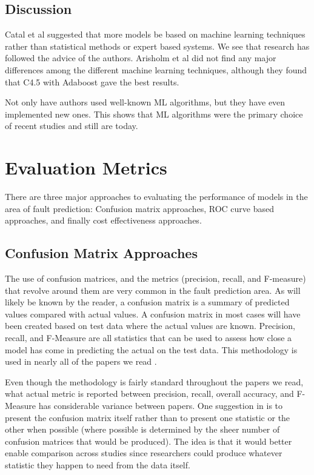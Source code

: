 \documentclass{sig-alternate-05-2015}
\begin{document}
\subsection{Discussion}
Catal et al \cite{Catal} suggested that more models be based on machine learning techniques rather than statistical methods or expert based systems. We see that research has followed the advice of the authors. Arisholm et al \cite{Arisholm} did not find any major differences among the different machine learning techniques, although they found that C4.5 with Adaboost gave the best results. 

Not only have authors used well-known ML algorithms, but they have even implemented new ones. This shows that ML algorithms were the primary choice of recent studies and still are today.

\section{Evaluation Metrics}

There are three major approaches to evaluating the performance of models in the area of fault prediction:  Confusion matrix approaches, ROC curve based approaches, and finally cost effectiveness approaches.

\subsection{Confusion Matrix Approaches}

The use of confusion matrices, and the metrics (precision, recall, and F-measure) that revolve around them are very common in the fault prediction area.  As will likely be known by the reader, a confusion matrix is a summary of predicted values compared with actual values.  A confusion matrix in most cases will have been created based on test data where the actual values are known.  Precision, recall, and F-Measure are all statistics that can be used to assess how close a model has come in predicting the actual on the test data.  This methodology is used in nearly all of the papers we read \cite{Posnett} \cite{Nam} \cite{Bird} \cite{Vandecruys} \cite{Nagappan} \cite{Arisholm} \cite{Rahman} \cite{Jiang}. 

Even though the methodology is fairly standard throughout the papers we read, what actual metric is reported between precision, recall, overall accuracy, and F-Measure has considerable variance between papers.  One suggestion in \cite{Hall} is to present the confusion matrix itself rather than to present one statistic or the other when possible (where possible is determined by the sheer number of confusion matrices that would be produced).  The idea is that it would better enable comparison across studies since researchers could produce whatever statistic they happen to need from the data itself.
\end{document}
